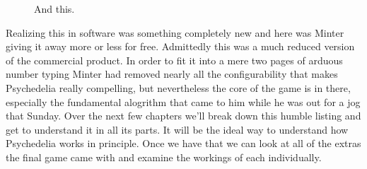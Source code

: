 \clearpage

\begin{figure}[H]
    \centering
    \begin{adjustbox}{width=12cm,center}
    \end{adjustbox}
\caption{And this.}
\end{figure}

Realizing this in software was something completely new and here was Minter giving it away more or less for free. Admittedly this was
a much reduced version of the commercial product. In order to fit it into a mere two pages of arduous number typing Minter had removed
nearly all the configurability that makes Psychedelia really compelling, but nevertheless the core of the game is in there, especially
the fundamental alogrithm that came to him while he was out for a jog that Sunday. Over the next few chapters we'll break down this
humble listing and get to understand it in all its parts. It will be the ideal way to understand how Psychedelia works in principle.
Once we have that we can look at all of the extras the final game came with and examine the workings of each individually.


